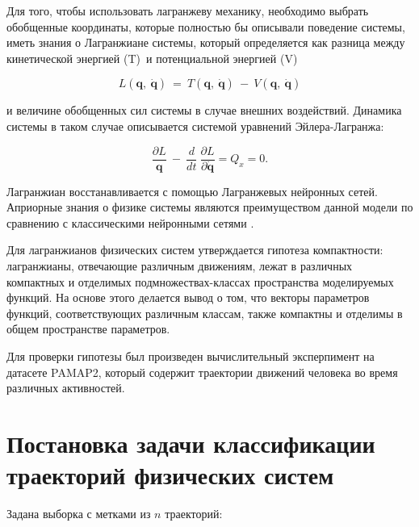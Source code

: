 \documentclass[12pt, twoside]{article}
\begin{document}
Для того, чтобы использовать лагранжеву механику, необходимо выбрать обобщенные координаты, которые полностью бы описывали поведение системы, иметь знания о Лагранжиане системы, который определяется как разница между кинетической энергией (T)\ и потенциальной энергией (V) 

\[L\left(\mathbf{q},\ \dot{\mathbf{q}}\right) \ =\ T\left(\mathbf{q},\ \dot{\mathbf{q}}\right)\ -\ V\left(\mathbf{q},\ \dot{\mathbf{q}}\right)  \]

\noindent
и величине обобщенных сил системы в случае внешних воздействий.
Динамика системы в таком случае описывается системой уравнений Эйлера-Лагранжа: 

\[ \frac{\partial L}{\mathbf{q}}\ -\ \frac{d}{dt}\ \frac{\partial L}{\partial\dot{\mathbf{q}}}=Q_x=0.\]

\noindent
Лагранжиан восстанавливается с помощью Лагранжевых нейронных сетей. Априорные знания о физике системы
являются преимуществом данной модели по сравнению с классическими нейронными сетями \cite{Thesis} \cite{article}.

Для лагранжианов физических систем утверждается гипотеза компактности: лагранжианы, отвечающие различным движениям, лежат в различных компактных и отделимых подмножествах-классах пространства моделируемых функций. На основе этого делается вывод о том, что векторы параметров функций, соответствующих различным классам, также компактны и отделимы в общем пространстве параметров. 

Для проверки гипотезы был произведен вычислительный эксперпимент на датасете PAMAP2, который содержит траектории движений человека во время различных активностей.

\section{Постановка задачи классификации траекторий физических систем}

Задана выборка с метками из $n$ траекторий: 
\end{document}
